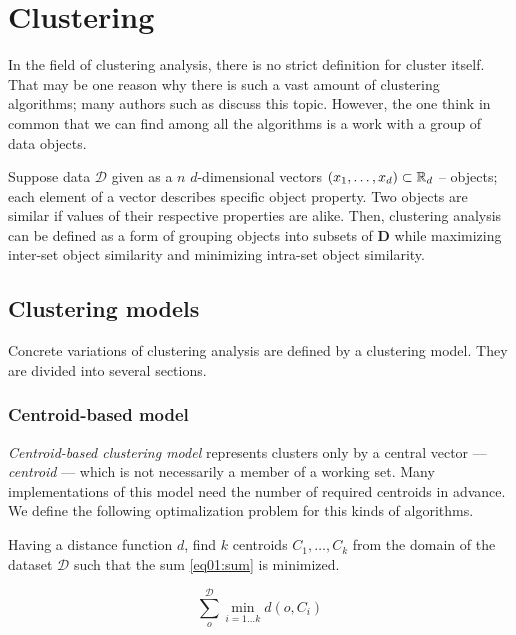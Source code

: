 \chapter{Clustering}

In the field of clustering analysis, there is no strict definition for cluster itself. That may be one reason why there is such a vast amount of clustering algorithms; many authors such as \citet{estivill2002so} discuss this topic.  However, the one think in common that we can find among all the algorithms is a work with a group of data objects.

Suppose data $\mathcal{D}$ given as a $n$ $d$-dimensional vectors $(x_1,\dots,x_d) \subset \mathbb{R}_d$  -- objects; each element of a vector describes specific object property. Two objects are similar if values of their respective properties are alike. Then, clustering analysis can be defined as a form of grouping objects into subsets of $\mathbf{D}$ while maximizing inter-set object similarity and minimizing intra-set object similarity.

\section{Clustering models}

Concrete variations of clustering analysis are defined by a clustering model. They are divided into several sections.

\subsection{Centroid-based model}

\emph{Centroid-based clustering model} represents clusters only by a central vector --- \emph{centroid} --- which is not necessarily a member of a working set. Many implementations of this model need the number of required centroids in advance. We define the following optimalization problem for this kinds of algorithms. 

\begin{problem}
	Having a distance function $d$, find $k$ centroids $C_1,\dots,C_k$ from the domain of the dataset $\mathcal{D}$ such that the sum \ref{eq01:sum}
	is minimized.
\end{problem}

\begin{equation}\label{eq01:sum}
	\sum_o^{\mathcal{D}} \min_{i=1\dots k}d(o,C_i)
\end{equation}

